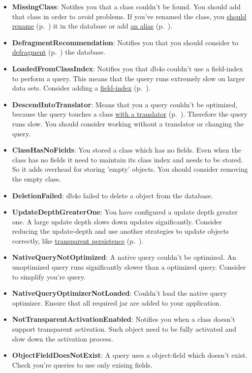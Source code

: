 \begin{itemize}
\item \textbf{MissingClass}: Notifies you that a class couldn't be found. You should add that class in order to avoid problems. If you've renamed the class, you \hyperref[ref:advanced-topics-refactoring-and-schema-evolution]{should rename} (p.~\pageref{ref:advanced-topics-refactoring-and-schema-evolution}) it in the database or add \hyperref[ref:configuration-common-alias]{an alias} (p.~\pageref{ref:configuration-common-alias}).
\item \textbf{DefragmentRecommendation}: Notifies you that you should consider to \hyperref[ref:advanced-topics-defragment]{defragment} (p.~\pageref{ref:advanced-topics-defragment}) the database.
\item \textbf{LoadedFromClassIndex}: Notifies you that db4o couldn't use a field-index to perform a query. This means that the query runs extremely slow on larger data sets. Consider adding a \hyperref[ref:basics-indexing]{field-index} (p.~\pageref{ref:basics-indexing}).
\item \textbf{DescendIntoTranslator}: Means that you a query couldn't be optimized, because the query touches a class \hyperref[ref:advanced-topics-type-handling-translators]{with a translator} (p.~\pageref{ref:advanced-topics-type-handling-translators}). Therefore the query runs slow. You should consider working without a translator or changing the query.
\item \textbf{ClassHasNoFields}: You stored a class which has no fields. Even when the class has no fields it need to maintain its class index and needs to be stored. So it adds overhead for storing 'empty' objects. You should consider removing the empty class.
\item \textbf{DeletionFailed}: db4o failed to delete a object from the database.
\item \textbf{UpdateDepthGreaterOne}: You have configured a update depth greater one. A large update depth slows down updates significantly. Consider reducing the update-depth and use another strategies to update objects correctly, like \hyperref[ref:basics-update-concept-transparent-persistence]{transparent persistence} (p.~\pageref{ref:basics-update-concept-transparent-persistence}).
\item \textbf{NativeQueryNotOptimized}: A native query couldn't be optimized. An unoptimized query runs significantly slower than a optimized query. Consider to simplify you're query.
\item \textbf{NativeQueryOptimizerNotLoaded}: Couldn't load the native query optimizer. Ensure that all required jar are added to your application.
\item \textbf{NotTransparentActivationEnabled}: Notifies you when a class doesn't support transparent activation. Such object need to be fully activated and slow down the activation process.
\item \textbf{ObjectFieldDoesNotExist}: A query uses a object-field which doesn't exist. Check you're queries to use only exising fields.
\end{itemize}

